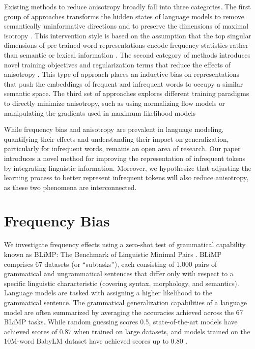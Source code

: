 Existing methods to reduce anisotropy broadly fall into three categories. The first group of approaches transforms the hidden states of language models to remove semantically uninformative directions and to preserve the dimensions of maximal isotropy \citep{arora2016simple, mu2018all, raunak2019effective, su2021whitening,bis2021too}. This intervention style is based on the assumption that the top singular dimensions of pre-trained word representations encode frequency statistics rather than semantic or lexical information \citep{mu2018all}. The second category of methods introduces novel training objectives and regularization terms that reduce the effects of anisotropy \citep{gong2018frage, gao2018representation, wang2019improving}. This type of approach places an inductive bias on representations that push the embeddings of frequent and infrequent words to occupy a similar semantic space. The third set of approaches explores different training paradigms to directly minimize anisotropy, such as using normalizing flow models \citep{li2020sentence} or manipulating the gradients used in maximum likelihood models \citep{yu2022rare}

\vspace{1em}

While frequency bias and anisotropy are prevalent in language modeling, quantifying their effects and understanding their impact on generalization, particularly for infrequent words, remains an open area of research. Our paper introduces a novel method for improving the representation of infrequent tokens by integrating linguistic information. Moreover, we hypothesize that adjusting the learning process to better represent infrequent tokens will also reduce anisotropy, as these two phenomena are interconnected.

\section{Frequency Bias}
\label{section:freq-bias}

We investigate frequency effects using a zero-shot test of grammatical capability known as BLiMP: The Benchmark of Linguistic Minimal Pairs \cite{warstadt2020blimp}. BLiMP comprises 67 datasets (or ``subtasks''), each consisting of 1,000 pairs of grammatical and ungrammatical sentences that differ only with respect to a specific linguistic characteristic (covering syntax, morphology, and semantics). Language models are tasked with assigning a higher likelihood to the grammatical sentence. The grammatical generalization capabilities of a language model are often summarized by averaging the accuracies achieved across the 67 BLiMP tasks. While random guessing scores 0.5, state-of-the-art models have achieved scores of 0.87 when trained on large datasets, and models trained on the 10M-word BabyLM dataset have achieved scores up to 0.80 \citep{warstadt2023babylm1}. 

